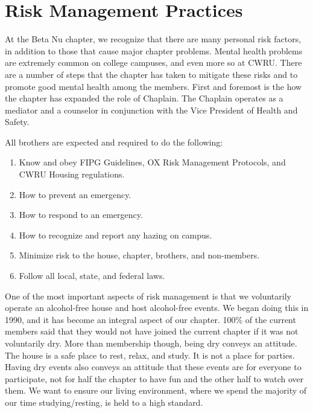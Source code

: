 \chapter{Risk Management Practices}

  At the Beta Nu chapter, we recognize that there are many personal risk factors, in addition to those that cause major chapter problems. Mental health problems are extremely common on college campuses, and even more so at CWRU. There are a number of steps that the chapter has taken to mitigate these risks and to promote good mental health among the members. First and foremost is the how the chapter has expanded the role of Chaplain. The Chaplain operates as a mediator and a counselor in conjunction with the Vice President of Health and Safety. 
  
  All brothers are expected and required to do the following: 
  
  \begin{enumerate}
  	\item Know and obey FIPG Guidelines, OX Risk Management Protocols, and CWRU Housing regulations. 
  	
  	\item How to prevent an emergency.
  	
  	\item How to respond to an emergency.
  	
  	\item How to recognize and report any hazing on campus.
  	
  	\item Minimize risk to the house, chapter, brothers, and non-members. 
  	
  	\item Follow all local, state, and federal laws.
  \end{enumerate}

  One of the most important aspects of risk management is that we voluntarily operate an alcohol-free house and host alcohol-free events. We began doing this in 1990, and it has become an integral aspect of our chapter. 100\% of the current members said that they would not have joined the current chapter if it was not voluntarily dry. More than membership though, being dry conveys an attitude. The house is a safe place to rest, relax, and study. It is not a place for parties. Having dry events also conveys an attitude that these events are for everyone to participate, not for half the chapter to have fun and the other half to watch over them. We want to ensure our living environment, where we spend the majority of our time studying/resting, is held to a high standard. \\

